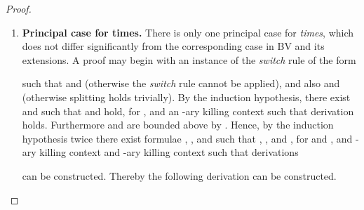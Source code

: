 \begin{proof}
\begin{enumerate}[label=\textbf{\Alph*},ref=\Alph*,leftmargin=*]
\begin{enumerate}[label*=\textbf{.\arabic*}]
\begin{comment}
By a fourth induction, there exist  and  such that  and , for , and -ary killing context  such that the following derivation holds.

In the case , by Lemma~\ref{lemma:medial}, the following derivation holds, where  and  and killing contexts  and .

In the case , by Lemma~\ref{lemma:medial}, the following derivation holds, where  and  and killing contexts  and .

Define the formulae
 and 
.
If , then define 
and .
	If , then define 
and .
Hence we construct the following derivation, using Lemma~\ref{lemma:medial} again, for some  and  and killing contexts  and .

We aim now to establish  and
.
Firstly, observe that  then
, since , by Lemma~\ref{lemma:nfv}, .
Also, if  then 
.
Furthermore, the following proof can be constructed.

Thereby, in either case .
A similar argument establishes 
.

By applying the above proofs appropriately, the following two proofs can be constructed.


Furthermore, by Lemma~\ref{lemma:bound}, the following inequalities holds.

Hence, by Lemma~\ref{lemma:multisets}, the size of the formulae
 and

  are strictly bounded above by the size of 
, as required.
\end{comment}


 
\end{enumerate}


\item \textbf{Principal case for times.}
There is only one principal case for \textit{times}, which does not differ significantly from the corresponding case in \textsf{BV} and its extensions. A proof may begin with an instance of the \textit{switch} rule of the form

such that  and  (otherwise the \textit{switch} rule cannot be applied), and also  and  (otherwise splitting holds trivially).
By the induction hypothesis, there exist  and  such that  and  hold, for , and an -ary killing context  such that 
derivation  holds.
Furthermore  and  are bounded above by .
Hence, by the induction hypothesis twice there exist formulae , ,  and  such that , ,  and , for  and , and -ary killing context  and -ary killing context  such that derivations
 
can be constructed.
Thereby the following derivation can be constructed.


\end{enumerate}
\end{proof}
